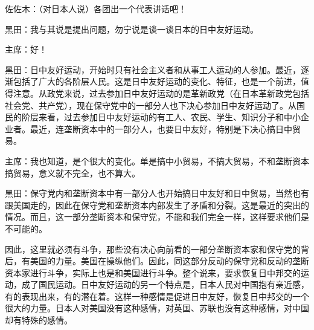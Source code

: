 佐佐木：（对日本人说）各团出一个代表讲话吧！

黑田：我与其说是提出问题，勿宁说是谈一谈日本的日中友好运动。

主席：好！

黑田：日中友好运动，开始时只有社会主义者和从事工人运动的人参加。最近，逐渐包括了广大的各阶层人民。这是日中友好运动的变化、特征，也是一个前进，值得注意。从政党来说，过去参加日中友好运动的是革新政党（在日本革新政党包括社会党、共产党），现在保守党中的一部分人也下决心参加日中友好运动了。从国民的阶层来看，过去参加日中友好运动的有工人、农民、学生、知识分子和中小企业者。最近，连垄断资本中的一部分人，也要日中友好，特别是下决心搞日中贸易。

主席：我也知道，是个很大的变化。单是搞中小贸易，不搞大贸易，不和垄断资本搞贸易，意义就不完全，也不算大。

黑田：保守党内和垄断资本中有一部分人也开始搞日中友好和日中贸易，当然也有跟美国走的，因此在保守党和垄断资本内部发生了矛盾和分裂。这是最近的突出的情况。而且，这一部分垄断资本和保守党，不能和我们完全一样，这样要求他们是不可能的。

因此，这里就必须有斗争，那些没有决心向前看的一部分垄断资本家和保守党的背后，有美国的力量。美国在操纵他们。因此，同这部分反动的保守党和反动的垄断资本家进行斗争，实际上也是和美国进行斗争。整个说来，要求恢复日中邦交的运动，成了国民运动。日中友好运动的另一个特点是，日本人民对中国抱有亲近感，有的表现出来，有的潜在着。这样一种感情是促进日中友好，恢复日中邦交的一个很大的力量。日本人对美国没有这种感情，对英国、苏联也没有这种感情，对中国却有特殊的感情。

